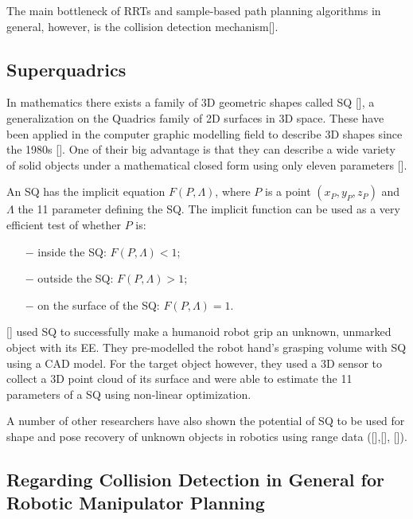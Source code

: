 The main bottleneck of \gls{RRT}s and sample-based path planning algorithms in general, however, is the collision detection mechanism[\citeauthor{LaValle2006}].

\subsection*{Superquadrics} 

In mathematics there exists a family of 3D geometric shapes called \gls{SQ} [\citeauthor{Jaklic2000}], a generalization on the Quadrics family of 2D surfaces in 3D space. These have been applied in the computer graphic modelling field to describe 3D shapes since the 1980s [\citeauthor{Yerry1985}]. One of their big advantage is that they can describe a wide variety of solid objects under a mathematical closed form using only eleven parameters [\citeauthor{Katsoulas2003}]. 

An \gls{SQ} has the implicit equation $F(P, \Lambda)$, where $P$ is a point $(x_P,y_P,z_P)$ and $\Lambda$ the 11 parameter defining the \gls{SQ}. The implicit function can be used as a very efficient test of whether $P$ is:

\begin{enumerate}
	\item[$-$] inside the \gls{SQ}: $F(P, \Lambda) < 1$;
	\item[$-$] outside the \gls{SQ}: $F(P, \Lambda) > 1$;
	\item[$-$] on the surface of the \gls{SQ}: $F(P, \Lambda) = 1$.
\end{enumerate}

[\citeauthor{Fantacci2017}] used \gls{SQ} to successfully make a humanoid robot grip an unknown, unmarked object with its \gls{EE}. They pre-modelled the robot hand’s grasping volume with \gls{SQ} using a \gls{CAD} model. For the target object however, they used a 3D sensor to collect a 3D point cloud of its surface and were able to estimate the 11 parameters of a \gls{SQ} using non-linear optimization. 

A number of other researchers have also shown the potential of \gls{SQ} to be used for shape and pose recovery of unknown objects in robotics using range data ([\citeauthor{Duncan2013}],[\citeauthor{Silva2016}], [\citeauthor{Biegelbauer2007}]). 

\subsection*{Regarding Collision Detection in General for Robotic Manipulator Planning} 


